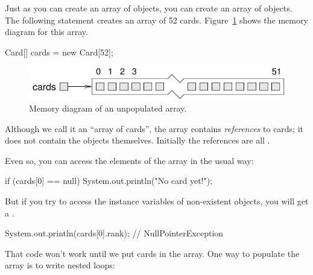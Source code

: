 
Just as you can create an array of  objects, you can create an array of  objects.
The following statement creates an array of 52 cards.
Figure~\ref{fig.cardarray} shows the memory diagram for this array.

\begin{code}
Card[] cards = new Card[52];
\end{code}

\begin{figure}[!ht]
\begin{center}
\includegraphics{figs/cardarray.pdf}
\caption{Memory diagram of an unpopulated  array.}
\label{fig.cardarray}
\end{center}
\end{figure}



Although we call it an ``array of cards'', the array contains {\em references} to cards; it does not contain the  objects themselves.
Initially the references are all .

Even so, you can access the elements of the array in the usual way:

\begin{code}
if (cards[0] == null) {
    System.out.println("No card yet!");
}
\end{code}


But if you try to access the instance variables of non-existent  objects, you will get a .

\begin{code}
System.out.println(cards[0].rank);  // NullPointerException
\end{code}


That code won't work until we put cards in the array.
One way to populate the array is to write nested  loops:

